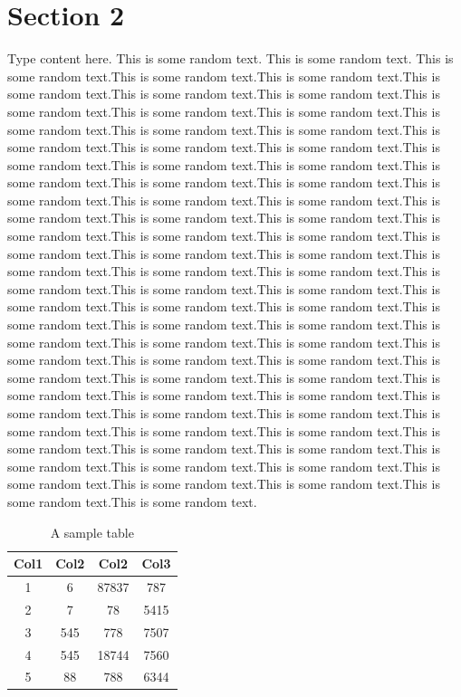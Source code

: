 \section{Section 2}
Type content here. This is some random text. This is some random text. This is some random text.This is some random text.This is some random text.This is some random text.This is some random text.This is some random text.This is some random text.This is some random text.This is some random text.This is some random text.This is some random text.This is some random text.This is some random text.This is some random text.This is some random text.This is some random text.This is some random text.This is some random text.This is some random text.This is some random text.This is some random text.This is some random text.This is some random text.This is some random text.This is some random text.This is some random text.This is some random text.This is some random text.This is some random text.This is some random text.This is some random text.This is some random text.This is some random text.This is some random text.This is some random text.This is some random text.This is some random text.This is some random text.This is some random text.This is some random text.This is some random text.This is some random text.This is some random text.This is some random text.This is some random text.This is some random text.This is some random text.This is some random text.This is some random text.This is some random text.This is some random text.This is some random text.This is some random text.This is some random text.This is some random text.This is some random text.This is some random text.This is some random text.This is some random text.This is some random text.This is some random text.This is some random text.This is some random text.This is some random text.This is some random text.This is some random text.This is some random text.This is some random text.This is some random text.This is some random text.This is some random text.This is some random text.This is some random text.This is some random text.

\begin{table}[h]
	\caption{A sample table}
	\centering
	\begin{tabular}{||c c c c||} 
		\hline
		Col1 & Col2 & Col2 & Col3 \\ [0.5ex] 
		\hline\hline
		1 & 6 & 87837 & 787 \\ 
		2 & 7 & 78 & 5415 \\
		3 & 545 & 778 & 7507 \\
		4 & 545 & 18744 & 7560 \\
		5 & 88 & 788 & 6344 \\ [1ex] 
		\hline
	\end{tabular}
\end{table}


